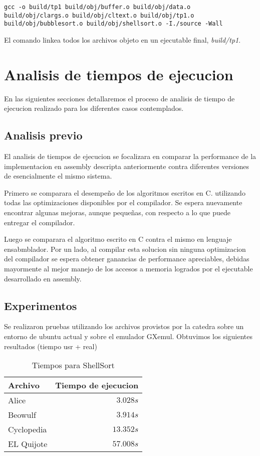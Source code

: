 \documentclass[a4paper,11pt]{article}
\begin{document}
\begin{lstlisting}
gcc -o build/tp1 build/obj/buffer.o build/obj/data.o build/obj/clargs.o build/obj/cltext.o build/obj/tp1.o build/obj/bubblesort.o build/obj/shellsort.o -I./source -Wall 
\end{lstlisting}

El comando linkea todos los archivos objeto en un ejecutable final,
\textit{build/tp1}.

\section{Analisis de tiempos de ejecucion}

En las siguientes secciones detallaremos el proceso de analisis de tiempo de
ejecucion realizado para los diferentes casos contemplados.

\subsection{Analisis previo}\label{sec:tiempos}

El analisis de tiempos de ejecucion se focalizara en comparar la performance de
la implementacion en assembly descripta anteriormente contra diferentes
versiones de esencialmente el mismo sistema.

Primero se comparara el desempeño de los algoritmos escritos en C. utilizando todas las optimizaciones disponibles por el
compilador. Se espera nuevamente encontrar algunas mejoras, aunque pequeñas,
con respecto a lo que puede entregar el compilador.

Luego se comparara el algoritmo escrito en C contra el mismo en lenguaje ensabmblador.
Por un lado, al compilar esta solucion sin ninguna optimizacion del compilador 
se espera obtener ganancias de performance apreciables, debidas mayormente al 
mejor manejo de los accesos a memoria logrados por el ejecutable desarrollado en assembly.

\subsection{Experimentos}

Se realizaron pruebas utilizando los archivos provistos por la catedra sobre un entorno de ubuntu actual y sobre el emulador GXemul.
Obtuvimos los siguientes resultados (tiempo usr + real)

\FloatBarrier

\begin{table}[h!t]
\centering
\begin{tabular}{ | l | r | }
  \hline
  Archivo          & Tiempo de ejecucion \\ \hline
  Alice				 & \(3.028s\) \\
  Beowulf     & \(3.914s\) \\
  Cyclopedia     & \(13.352s\) \\
  EL Quijote      & \(57.008s\) \\
  \hline
\end{tabular}

\caption{Tiempos para ShellSort}
\label{tab:resultados}
\end{table}
\end{document}
